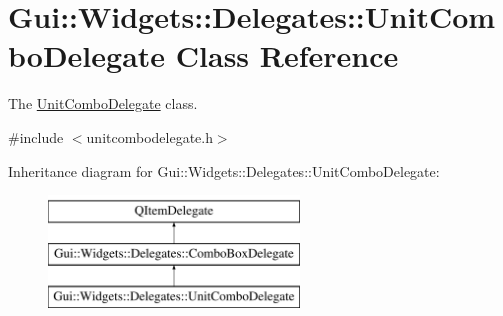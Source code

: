 \hypertarget{classGui_1_1Widgets_1_1Delegates_1_1UnitComboDelegate}{\section{Gui\-:\-:Widgets\-:\-:Delegates\-:\-:Unit\-Combo\-Delegate Class Reference}
\label{classGui_1_1Widgets_1_1Delegates_1_1UnitComboDelegate}
}


The \hyperlink{classGui_1_1Widgets_1_1Delegates_1_1UnitComboDelegate}{Unit\-Combo\-Delegate} class.  




{\ttfamily \#include $<$unitcombodelegate.\-h$>$}

Inheritance diagram for Gui\-:\-:Widgets\-:\-:Delegates\-:\-:Unit\-Combo\-Delegate\-:\begin{figure}[H]
\begin{center}
\leavevmode
\includegraphics[height=3.000000cm]{db/def/classGui_1_1Widgets_1_1Delegates_1_1UnitComboDelegate}
\end{center}
\end{figure}
